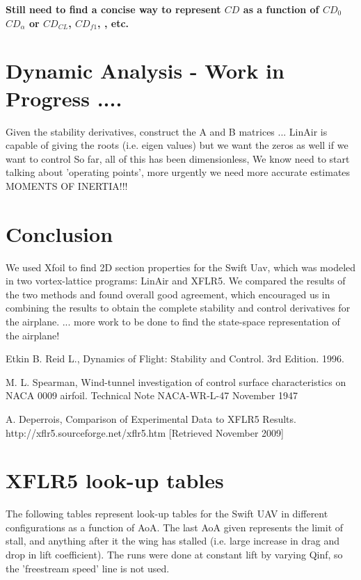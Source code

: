 \documentclass[titlepage,10pt]{article}
\begin{document}
\textbf{Still need to find a concise way to represent $CD$ as a function of $CD_0$ $CD_\alpha$ or $CD_{CL}$, $CD_{f1}$, , etc. }


\section{Dynamic Analysis - Work in Progress ....}
Given the stability derivatives, construct the A and B matrices ...
LinAir is capable of giving the roots (i.e. eigen values) but we want the zeros as well if we want to control
So far, all of this has been dimensionless, We know need to start talking about 'operating points', more urgently
we need more accurate estimates MOMENTS OF INERTIA!!!


 								 
\section{Conclusion}
We used Xfoil to find 2D section properties for the Swift Uav, which was modeled in two vortex-lattice programs: LinAir and XFLR5. We compared the results of the two methods and found overall good agreement, which encouraged us in combining the results to obtain the complete stability and control derivatives for the airplane. ... more work to be done to find the state-space representation of the airplane!


\begin{thebibliography}{9}
  Etkin B. Reid L.,
  Dynamics of Flight: Stability and Control.
  3rd Edition.
  1996.
  
 M. L. Spearman,
 Wind-tunnel investigation of control surface characteristics on NACA 0009 airfoil.
 Technical Note NACA-WR-L-47
 November 1947

  A. Deperrois,
  Comparison of Experimental Data to XFLR5 Results.
  http://xflr5.sourceforge.net/xflr5.htm
  [Retrieved November 2009]


\end{thebibliography}
\newpage
\appendix

\newpage
\section{XFLR5 look-up tables}
The following tables represent look-up tables for the Swift UAV in different configurations as a function of AoA. The last AoA given represents the limit of stall, and anything after it the wing has stalled (i.e. large increase in drag and drop in lift coefficient). The runs were done at constant lift by varying Qinf, so the 'freestream speed' line is not used. \\
\end{document}
